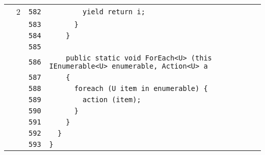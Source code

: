 \documentclass[a4paper,10pt]{article}
\begin{document}
\begin{longtable}[l]{lrrl}
\cellcolor{green} & 2 & \verb~582~ & \verb~        yield return i;~\\
\cellcolor{gray} &  & \verb~583~ & \verb~      }~\\
\cellcolor{gray} &  & \verb~584~ & \verb~    }~\\
\cellcolor{gray} &  & \verb~585~ & \verb~~\\
\cellcolor{gray} &  & \verb~586~ & \verb~    public static void ForEach<U> (this IEnumerable<U> enumerable, Action<U> a~\\
\cellcolor{gray} &  & \verb~587~ & \verb~    {~\\
\cellcolor{gray} &  & \verb~588~ & \verb~      foreach (U item in enumerable) {~\\
\cellcolor{gray} &  & \verb~589~ & \verb~        action (item);~\\
\cellcolor{gray} &  & \verb~590~ & \verb~      }~\\
\cellcolor{gray} &  & \verb~591~ & \verb~    }~\\
\cellcolor{gray} &  & \verb~592~ & \verb~  }~\\
\cellcolor{gray} &  & \verb~593~ & \verb~}~\\
\end{longtable}
\end{document}
